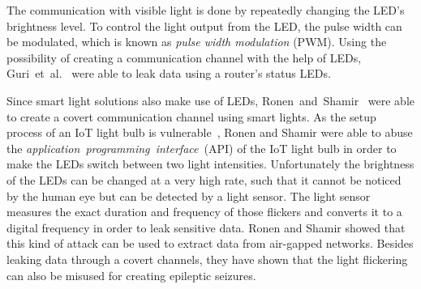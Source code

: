 \documentclass[11pt,a4paper]{article}
\begin{document}
	The communication with visible light is done by repeatedly changing the LED's brightness level. To control the light output from the LED, the pulse width can be modulated, which is known as \textit{pulse width modulation} (PWM).  
	Using the possibility of creating a communication channel with the help of LEDs, Guri~et~al.~\cite{Guri:2017:xCDEANvRL} were able to leak data using a router's status LEDs.
	
	Since smart light solutions also make use of LEDs, Ronen~and~Shamir~\cite{Ronen:2016:EFAIDCSL} were able to create a covert communication channel using smart lights.
	As the setup process of an IoT light bulb is vulnerable~\cite{Dhanjani:2013:HLSEPHPWLS, Morgner:2016:AYBBUICSSCLS, Ronen:2018:IGNCZCR}, Ronen and Shamir were able to abuse the \textit{application~programming~interface}~(API) of the IoT light bulb in order to make the LEDs switch between two light intensities. Unfortunately the brightness of the LEDs can be changed at a very high rate, such that it cannot be noticed by the human eye but can be detected by a light sensor. 
	The light sensor measures the exact duration and frequency of those flickers and converts it to a digital frequency in order to leak sensitive data.
	Ronen and Shamir showed that this kind of attack can be used to extract data from air-gapped networks.
	Besides leaking data through a covert channels, they have shown that the light flickering can also be misused for creating epileptic seizures.

	\newpage

	
	
\end{document}
